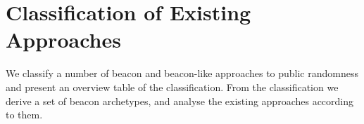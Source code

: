 \section{Classification of Existing Approaches}\label{sec:classification}

We classify a number of beacon and beacon-like approaches to public randomness and present an overview table of the classification.
From the classification we derive a set of beacon archetypes, and analyse the existing approaches according to them.
